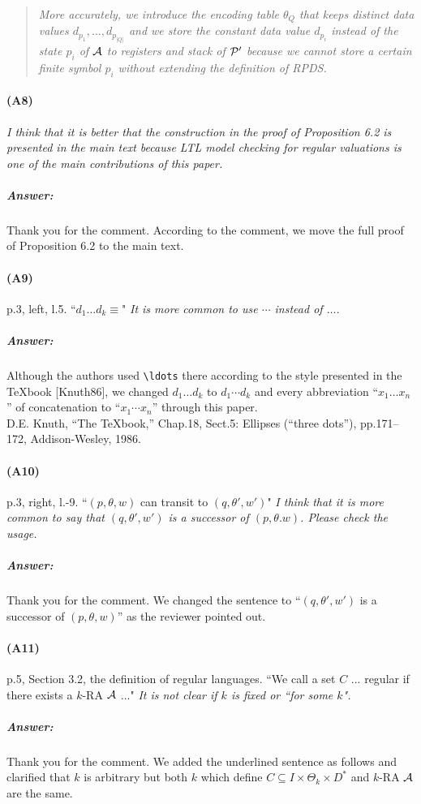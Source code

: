 \documentclass{article}
\begin{document}
\begin{quote}\em
	More accurately, we introduce the encoding table $\theta_Q$ that keeps distinct data values $d_{p_1},\ldots,d_{p_{|Q|}}$ and
	we store the constant data value $d_{p_i}$ instead of the state $p_i$ of ${\cal A}$
	to registers and stack of ${\cal P}'$ because we cannot store a certain finite symbol $p_i$ without extending the definition of RPDS.
\end{quote}


\paragraph{(A8)}
\textit{
I think that it is better that the construction in the proof of Proposition 6.2 is presented in the
main text because LTL model checking for regular valuations is one of the main contributions
of this paper.
}
\subparagraph{Answer:}
Thank you for the comment.
According to the comment,
we move the full proof of Proposition 6.2 to the main text.


\paragraph{(A9)} p.3, left, l.5. ``$d_1 \ldots d_k \equiv$" \newline
\textit{
It is more common to use $\cdots$ instead of $\ldots$.
}
\subparagraph{Answer:}
Although the authors used \verb+\ldots+ there according to the style
presented in the \TeX{}book [Knuth86],
we changed $d_1\ldots d_k$ to $d_1\cdots d_k$
and every abbreviation ``$x_1\ldots x_n$'' of concatenation
to ``$x_1\cdots x_n$'' through this paper.
\medskip\noindent\\\noindent
[Knuth86] D.E. Knuth, ``The \TeX{}book,'' 
Chap.18, Sect.5: Ellipses (``three dots''), pp.171--172,
Addison-Wesley, 1986.

\paragraph{(A10)} p.3, right, l.-9. ``$(p, \theta, w)$ can transit to $(q, \theta', w')$" \newline
\textit{
I think that it is more common to say that $(q, \theta', w')$ is a successor of
$(p, \theta. w)$. Please check the usage.
}
\subparagraph{Answer:}
Thank you for the comment.
We changed the sentence to ``$(q, \theta', w')$ is a successor of $(p, \theta, w)$'' as the reviewer pointed out.


\paragraph{(A11)} p.5, Section 3.2, the definition of regular languages.
``We call a set $C$ ... regular if there exists a $k$-RA ${\cal A}$ ..."\newline
\textit{
It is not clear if $k$ is fixed or ``for some $k$".
}
\subparagraph{Answer:}
Thank you for the comment. We added the underlined sentence as follows and clarified that
$k$ is arbitrary but both $k$ which define $C\subseteq I\times\Theta_k\times D^*$ and $k$-RA ${\cal A}$ are the same.
\end{document}
